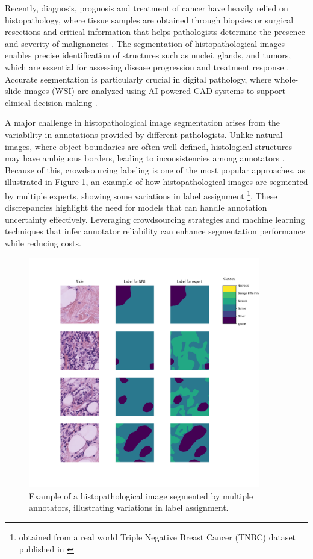 Recently, diagnosis, prognosis and treatment of cancer have heavily
relied on histopathology, where tissue samples are obtained through biopsies or
surgical resections and critical information that helps
pathologists determine the presence and severity of malignancies
\cite{LopezEtAl2024}. The segmentation of histopathological images
enables precise identification of structures such as nuclei, glands, and tumors,
which are essential for assessing disease progression and treatment
response \cite{Rashmi2021}. Accurate segmentation is particularly
crucial in digital pathology, where whole-slide images (\gls{WSI})
are analyzed using AI-powered \gls{CAD} systems to support
clinical decision-making \cite{LopezEtAl2024}.

A major challenge in histopathological image segmentation arises from
the variability in annotations provided by different pathologists.
Unlike natural images, where object boundaries are often
well-defined, histological structures may have ambiguous borders,
leading to inconsistencies among annotators \cite{Lopez2023}. Because of this,
crowdsourcing labeling is one of the most popular approaches, as
illustrated in Figure \ref{fig:multiannotator_segmentation},
an example of how histopathological images are segmented by
multiple experts, showing some variations in label assignment
\footnote{obtained from a real world Triple Negative Breast
Cancer (TNBC) dataset published in \cite{Lopez2023}}. These
discrepancies highlight the need for models that can handle
annotation uncertainty effectively. Leveraging crowdsourcing
strategies and machine learning techniques that infer annotator
reliability can enhance segmentation performance while reducing costs.
\begin{figure}
  \centering
  \includegraphics[width=0.9\textwidth]{Cap1/Figures/multiannotator-segmentation.png}
  \caption{Example of a histopathological image segmented by multiple
  annotators, illustrating variations in label assignment.}
  \label{fig:multiannotator_segmentation}
\end{figure}